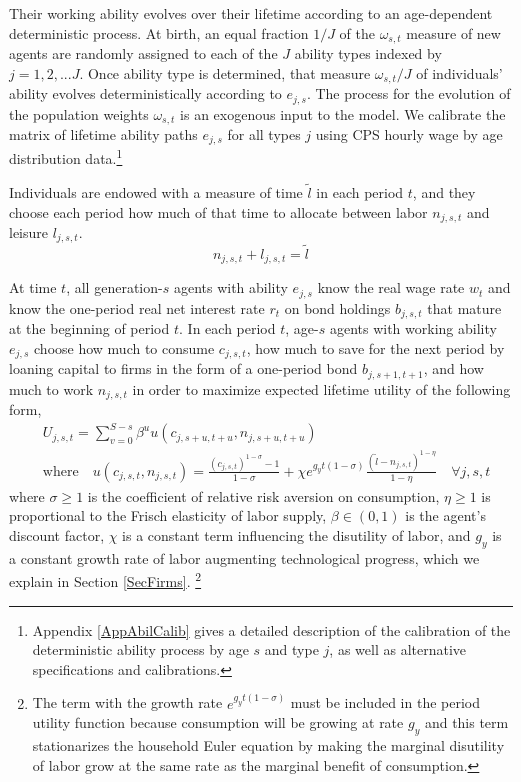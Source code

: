 \documentclass[letterpaper,12pt]{article}
\theoremstyle{definition}
\begin{document}
\begin{spacing}{1.5}
    Their working ability evolves over their lifetime according to an age-dependent deterministic process. At birth, an equal fraction $1/J$ of the $\omega_{s,t}$ measure of new agents are randomly assigned to each of the $J$ ability types indexed by $j=1,2,...J$. Once ability type is determined, that measure $\omega_{s,t}/J$ of individuals' ability evolves deterministically according to $e_{j,s}$. The process for the evolution of the population weights $\omega_{s,t}$ is an exogenous input to the model. We calibrate the matrix of lifetime ability paths $e_{j,s}$ for all types $j$ using CPS hourly wage by age distribution data.\footnote{Appendix \ref{AppAbilCalib} gives a detailed description of the calibration of the deterministic ability process by age $s$ and type $j$, as well as alternative specifications and calibrations.}

    Individuals are endowed with a measure of time $\tilde{l}$ in each period $t$, and they choose each period how much of that time to allocate between labor $n_{j,s,t}$ and leisure $l_{j,s,t}$.
    \begin{equation}\label{EqLabConstr}
      n_{j,s,t} + l_{j,s,t} = \tilde{l}
    \end{equation}

    \noindent At time $t$, all generation-$s$ agents with ability $e_{j,s}$ know the real wage rate $w_t$ and know the one-period real net interest rate $r_t$ on bond holdings $b_{j,s,t}$ that mature at the beginning of period $t$. In each period $t$, age-$s$ agents with working ability $e_{j,s}$ choose how much to consume $c_{j,s,t}$, how much to save for the next period by loaning capital to firms in the form of a one-period bond $b_{j,s+1,t+1}$, and how much to work $n_{j,s,t}$ in order to maximize expected lifetime utility of the following form,
    \begin{equation}\label{EqUtilMax}
      \begin{split}
        &U_{j,s,t} = \sum_{v=0}^{S-s}\beta^u u\left(c_{j,s+u,t+u},n_{j,s+u,t+u}\right) \\
        &\text{where} \quad u\left(c_{j,s,t},n_{j,s,t}\right) = \frac{\left(c_{j,s,t}\right)^{1-\sigma} - 1}{1-\sigma} + \chi e^{g_y t(1-\sigma)}\frac{(\tilde{l}-n_{j,s,t})^{1-\eta}}{1-\eta} \quad\forall j,s,t
      \end{split}
    \end{equation}
    where $\sigma\geq 1$ is the coefficient of relative risk aversion on consumption, $\eta\geq 1$ is proportional to the Frisch elasticity of labor supply, $\beta\in(0,1)$ is the agent's discount factor, $\chi$ is a constant term influencing the disutility of labor, and $g_y$ is a constant growth rate of labor augmenting technological progress, which we explain in Section \ref{SecFirms}. \footnote{The term with the growth rate $e^{g_y t(1-\sigma)}$ must be included in the period utility function because consumption will be growing at rate $g_y$ and this term stationarizes the household Euler equation by making the marginal disutility of labor grow at the same rate as the marginal benefit of consumption.}


\end{spacing}
\end{document}
